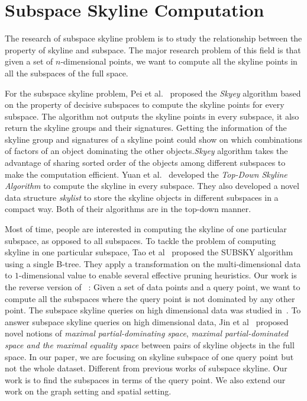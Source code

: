 \section{Subspace Skyline Computation}
\label{sec:rel:subspace}
The research of subspace skyline problem is to study the relationship between the property of skyline and subspace. The major research problem of this field is that given a set of $n$-dimensional points, we want to compute all the skyline points in all the subspaces of the full space.

For the subspace skyline problem, Pei et al.~\cite{pei2005catching} proposed the \emph{Skyey} algorithm based on the property of decisive subspaces to compute the skyline points for every subspace.  The algorithm not outputs the skyline points in every subspace, it also return the skyline groups and their signatures.
Getting the information of the skyline group and signatures of a skyline point could show on which combinations of factors of an object dominating the other objects.\emph{Skyey} algorithm takes the advantage of sharing sorted order of the objects among different subspaces to make the computation efficient. Yuan et al.~\cite{yuan2005efficient} developed the \emph{Top-Down Skyline Algorithm} to compute the skyline in every subspace. They also developed a novel data structure \emph{skylist} to store the skyline objects in different subspaces in a compact way. 
Both of their algorithms are in the top-down manner.

Most of time, people are interested in computing the skyline of one particular subspace, as opposed to all subspaces. To tackle the problem of computing skyline in one particular subspace, Tao et al~\cite{tao2006subsky} proposed the SUBSKY algorithm using a single B-tree. They apply a transformation on the multi-dimensional data to $1$-dimensional value to enable several effective pruning heuristics. Our work is the reverse version of ~\cite{tao2006subsky}: Given a set of data points and a query point, we want to compute all the subspaces where the query point is not dominated by any other point.
The subspace skyline queries on high dimensional data was studied in~\cite{jin2007efficient}. To answer subspace skyline queries on high dimensional data, Jin et al~\cite{jin2007efficient} proposed novel notions of \emph{maximal partial-dominating space}, \emph{maximal partial-dominated space and the maximal equality space} between pairs of skyline objects in the full space. In our paper, we are focusing on skyline subspace of one query point but not the whole dataset. Different from previous works of subspace skyline. Our work is to find the subspaces in terms of the query point. We also extend our work on the graph setting and spatial setting.

